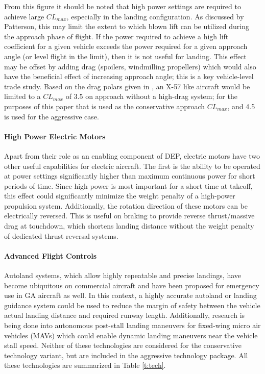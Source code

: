 \documentclass[]{aiaa-tc}%
\begin{document}
From this figure it should be noted that high power settings are required to achieve large $CL_{max}$, especially in the landing configuration.  As discussed by Patterson\cite{Patterson2017}, this may limit the extent to which blown lift can be utilized during the approach phase of flight.  If the power required to achieve a high lift coefficient for a given vehicle exceeds the power required for a given approach angle (or level flight in the limit), then it is not useful for landing.  This effect may be offset by adding drag (spoilers, windmilling propellers) which would also have the beneficial effect of increasing approach angle; this is a key vehicle-level trade study.  Based on the drag polars given in \cite{Deere}, an X-57 like aircraft would be limited to a $CL_{max}$ of 3.5 on approach without a high-drag system; for the purposes of this paper that is used as the conservative approach $CL_{max}$, and 4.5 is used for the aggressive case.  

\paragraph{High Power Electric Motors}
Apart from their role as an enabling component of DEP, electric motors have two other useful capabilities for electric aircraft.  The first is the ability to be operated at power settings significantly higher than maximum continuous power for short periods of time.  Since high power is most important for a short time at takeoff, this effect could significantly minimize the weight penalty of a high-power propulsion system\cite{Moore_Mis}. Additionally, the rotation direction of these motors can be electrically reversed.  This is useful on braking to provide reverse thrust/massive drag at touchdown, which shortens landing distance without the weight penalty of dedicated thrust reversal systems.  

\paragraph{Advanced Flight Controls}
Autoland systems, which allow highly repeatable and precise landings, have become ubiquitous on commercial aircraft and have been proposed for emergency use in GA aircraft as well\cite{Siegel2012}.  In this context, a highly accurate autoland or landing guidance system could be used to reduce the margin of safety between the vehicle actual landing distance and required runway length.  Additionally, research is being done into autonomous post-stall landing maneuvers for fixed-wing micro air vehicles (MAVs)\cite{Moore_Perch} which could enable dynamic landing maneuvers near the vehicle stall speed.  Neither of these technologies are considered for the conservative technology variant, but are included in the aggressive technology package.  All these technologies are summarized in Table \ref{t:tech}. 
\end{document}
